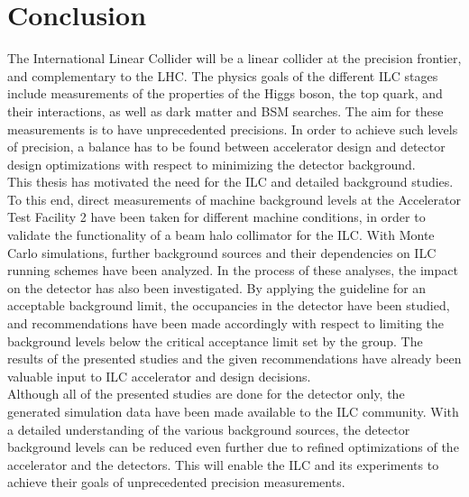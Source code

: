 \chapter{Conclusion}
\label{Conclusion}
The International Linear Collider will be a linear \positron\electron collider at the precision frontier, and complementary to the LHC.
The physics goals of the different ILC stages include measurements of the properties of the Higgs boson, the top quark, and their interactions, as well as dark matter and BSM searches.
The aim for these measurements is to have unprecedented precisions.
In order to achieve such levels of precision, a balance has to be found between accelerator design and detector design optimizations with respect to minimizing the detector background.
\\This thesis has motivated the need for the ILC and detailed background studies.
To this end, direct measurements of machine background levels at the Accelerator Test Facility 2 have been taken for different machine conditions, in order to validate the functionality of a beam halo collimator for the ILC.
With Monte Carlo simulations, further background sources and their dependencies on ILC running schemes have been analyzed.
In the process of these analyses, the impact on the \sid detector has also been investigated.
By applying the \sid guideline for an acceptable background limit, the occupancies in the detector have been studied, and recommendations have been made accordingly with respect to limiting the background levels below the critical acceptance limit set by the \sid group.
The results of the presented studies and the given recommendations have already been valuable input to ILC accelerator and \sid design decisions.
\\Although all of the presented studies are done for the \sid detector only, the generated simulation data have been made available to the ILC community.
With a detailed understanding of the various background sources, the detector background levels can be reduced even further due to refined optimizations of the accelerator and the detectors.
This will enable the ILC and its experiments to achieve their goals of unprecedented precision measurements.